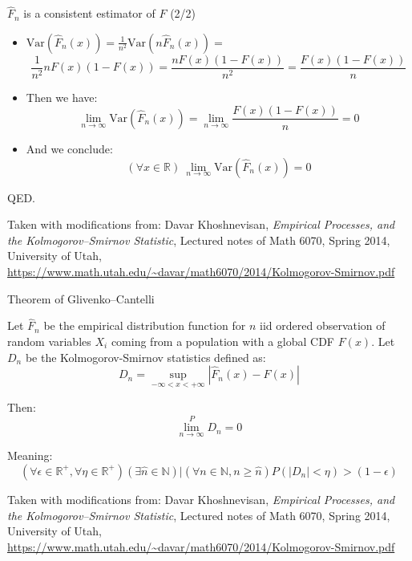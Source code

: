 \documentclass{beamer}
\begin{document}
\begin{frame}
{\centerline{$\widehat {F}_{n}$ is a consistent estimator of $F$ (2/2)}}

\begin{itemize}
\item  $\text{Var}(\widehat {F}_{n} (x)) =  \frac{1}{n^2} \text{Var}(n \widehat {F}_{n} (x)) = $
$$ \frac{1}{n^2} nF(x)(1-F(x)) =  \frac{nF(x)(1-F(x))}{n^2} = \frac{F(x)(1-F(x))}{n} $$
\item Then we have:
$$\lim_{n \to \infty} \text{Var}(\widehat {F}_{n} (x)) = \lim_{n \to \infty}   \frac{F(x)(1-F(x))}{n} = 0$$
\item And we conclude:
$$(\forall x \in \mathbb{R}) ~\lim_{n \to \infty} \text{Var}(\widehat {F}_{n} (x)) = 0$$

\end{itemize}
QED.


\begin{center}
\tiny{Taken with modifications from: Davar Khoshnevisan, \textit{Empirical Processes, and the Kolmogorov–Smirnov Statistic}, Lectured notes of Math 6070, Spring 2014, University of Utah, \url{https://www.math.utah.edu/~davar/math6070/2014/Kolmogorov-Smirnov.pdf}}
\end{center}

\end{frame}

\begin{frame}
{\centerline{Theorem of Glivenko–Cantelli}}

Let $\widehat {F}_{n}$ be the empirical distribution function for $n$ iid ordered observation of random variables $X_i$ coming from a population with a global CDF $F(x)$. Let $D_n$ be the Kolmogorov-Smirnov statistics defined as:
$$D_{n}=\sup _{-\infty < x < +\infty}|\widehat {F}_{n}(x)-F(x)|$$

Then:
$$\lim_{n \to \infty}^{P}  D_n = 0$$

Meaning:
$$(\forall \epsilon \in \mathbb{R^+}, \forall  \eta \in \mathbb{R^+}  ) (\exists \widehat{n} \in \mathbb{N}) | (\forall n \in  \mathbb{N}, n \geq  \widehat{n}) P(|D_n| < \eta) > (1 - \epsilon)$$



\begin{center}
\tiny{Taken with modifications from: Davar Khoshnevisan, \textit{Empirical Processes, and the Kolmogorov–Smirnov Statistic}, Lectured notes of Math 6070, Spring 2014, University of Utah, \url{https://www.math.utah.edu/~davar/math6070/2014/Kolmogorov-Smirnov.pdf}}
\end{center}

\end{frame}
\end{document}
